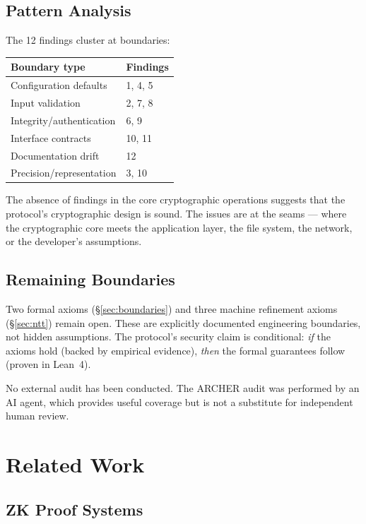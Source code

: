 \documentclass[11pt,a4paper]{article}
\begin{document}
\subsection{Pattern Analysis}

The 12 findings cluster at boundaries:

\begin{center}
\begin{tabular}{ll}
\toprule
\textbf{Boundary type} & \textbf{Findings} \\
\midrule
Configuration defaults & 1, 4, 5 \\
Input validation & 2, 7, 8 \\
Integrity/authentication & 6, 9 \\
Interface contracts & 10, 11 \\
Documentation drift & 12 \\
Precision/representation & 3, 10 \\
\bottomrule
\end{tabular}
\end{center}

The absence of findings in the core cryptographic operations suggests that the protocol's cryptographic design is sound. The issues are at the seams --- where the cryptographic core meets the application layer, the file system, the network, or the developer's assumptions.

\subsection{Remaining Boundaries}

Two formal axioms (\S\ref{sec:boundaries}) and three machine refinement axioms (\S\ref{sec:ntt}) remain open. These are explicitly documented engineering boundaries, not hidden assumptions. The protocol's security claim is conditional: \emph{if} the axioms hold (backed by empirical evidence), \emph{then} the formal guarantees follow (proven in Lean~4).

No external audit has been conducted. The ARCHER audit was performed by an AI agent, which provides useful coverage but is not a substitute for independent human review.

\section{Related Work}

\subsection{ZK Proof Systems}
\end{document}
